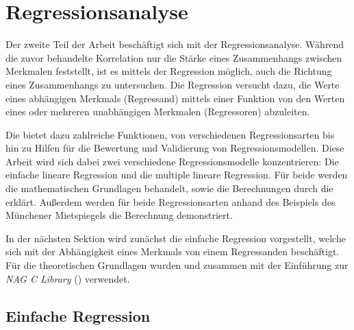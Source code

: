 \section{Regressionsanalyse}

Der zweite Teil der Arbeit beschäftigt sich mit der Regressionsanalyse.
Während die zuvor behandelte Korrelation nur die Stärke eines Zusammenhangs zwischen Merkmalen feststellt, ist es mittels der Regression möglich, auch die Richtung eines Zusammenhangs zu untersuchen.
Die Regression versucht dazu, die Werte eines abhängigen Merkmals (Regressand) mittels einer Funktion von den Werten eines oder mehreren unabhängigen Merkmalen (Regressoren) abzuleiten.

Die \naglib bietet dazu zahlreiche Funktionen, von verschiedenen Regressionsarten bis hin zu Hilfen für die Bewertung und Validierung von Regressionsmodellen.
Diese Arbeit wird sich dabei zwei verschiedene Regressionsmodelle konzentrieren:
Die einfache lineare Regression und die multiple lineare Regression.
Für beide werden die mathematischen Grundlagen behandelt, sowie die Berechnungen durch die \naglib erklärt. 
Außerdem werden für beide Regressionsarten anhand des Beispiels des Münchener Mietspiegels die Berechnung demonstriert.

In der nächsten Sektion wird zunächst die einfache Regression vorgestellt, welche sich mit der Abhängigkeit eines Merkmals von einem Regressanden beschäftigt.
Für die theoretischen Grundlagen wurden \cite{Cramer2007} und \cite{Fahrmeier2010} zusammen mit der Einführung zur {\it NAG C Library} (\cite{nag:intro}) verwendet.

\subsection{Einfache Regression}

